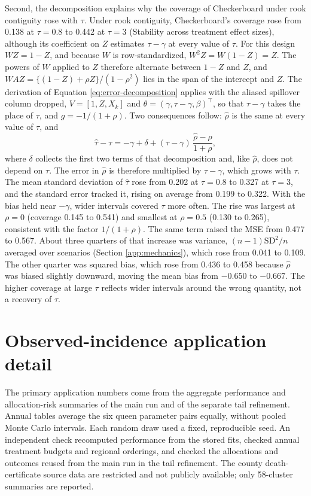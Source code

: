 \documentclass[11pt]{article}
\makeatletter
\newcommand{\applabel}[2]{\def\@currentlabel{#1}\label{#2}}
\makeatother
\begin{document}
Second, the decomposition explains why the coverage of Checkerboard
under rook contiguity rose with \(\tau\). Under rook contiguity,
Checkerboard's coverage rose from 0.138 at \(\tau = 0.8\) to 0.442 at
\(\tau = 3\) (Stability across treatment effect sizes), although its
coefficient on \(Z\) estimates \(\tau - \gamma\) at every value of
\(\tau\). For this design \(WZ = 1 - Z\), and because \(W\) is
row-standardized, \(W^2 Z = W(1 - Z) = Z\). The powers of \(W\) applied
to \(Z\) therefore alternate between \(1 - Z\) and \(Z\), and
\(WAZ = \{(1 - Z) + \rho Z\}/(1 - \rho^2)\) lies in the span of the
intercept and \(Z\). The derivation of Equation
\ref{eq:error-decomposition} applies with the aliased spillover column
dropped, \(V = [1, Z, X_k]\) and
\(\theta = (\gamma, \tau - \gamma, \beta)^\top\), so that
\(\tau - \gamma\) takes the place of \(\tau\), and
\(g = -1/(1 + \rho)\). Two consequences follow: \(\hat\rho\) is the same
at every value of \(\tau\), and \[
\hat\tau - \tau = -\gamma + \delta + (\tau - \gamma)\,\frac{\hat\rho - \rho}{1 + \rho},
\] where \(\delta\) collects the first two terms of that decomposition
and, like \(\hat\rho\), does not depend on \(\tau\). The error in
\(\hat\rho\) is therefore multiplied by \(\tau - \gamma\), which grows
with \(\tau\). The mean standard deviation of \(\hat\tau\) rose from
0.202 at \(\tau = 0.8\) to 0.327 at \(\tau = 3\), and the standard error
tracked it, rising on average from 0.199 to 0.322. With the bias held
near \(-\gamma\), wider intervals covered \(\tau\) more often. The rise
was largest at \(\rho = 0\) (coverage 0.145 to 0.541) and smallest at
\(\rho = 0.5\) (0.130 to 0.265), consistent with the factor
\(1/(1 + \rho)\). The same term raised the MSE from 0.477 to 0.567.
About three quarters of that increase was variance,
\((n-1)\text{SD}^2/n\) averaged over scenarios (Section
\ref{app:mechanics}), which rose from 0.041 to 0.109. The other quarter
was squared bias, which rose from 0.436 to 0.458 because \(\hat\rho\)
was biased slightly downward, moving the mean bias from \(-0.650\) to
\(-0.667\). The higher coverage at large \(\tau\) reflects wider
intervals around the wrong quantity, not a recovery of \(\tau\).

\FloatBarrier

\section{Observed-incidence application
detail}\label{s7.-observed-incidence-application-detail}

\applabel{S10}{app:nc}The primary application numbers come from the aggregate performance and allocation-risk summaries of the main run and of the separate tail refinement. Annual tables average the six queen parameter pairs equally, without pooled Monte Carlo intervals. Each random draw used a fixed, reproducible seed. An independent check recomputed performance from the stored fits, checked annual treatment budgets and regional orderings, and checked the allocations and outcomes reused from the main run in the tail refinement. The county death-certificate source data are restricted and not publicly available; only 58-cluster summaries are reported.
\end{document}
